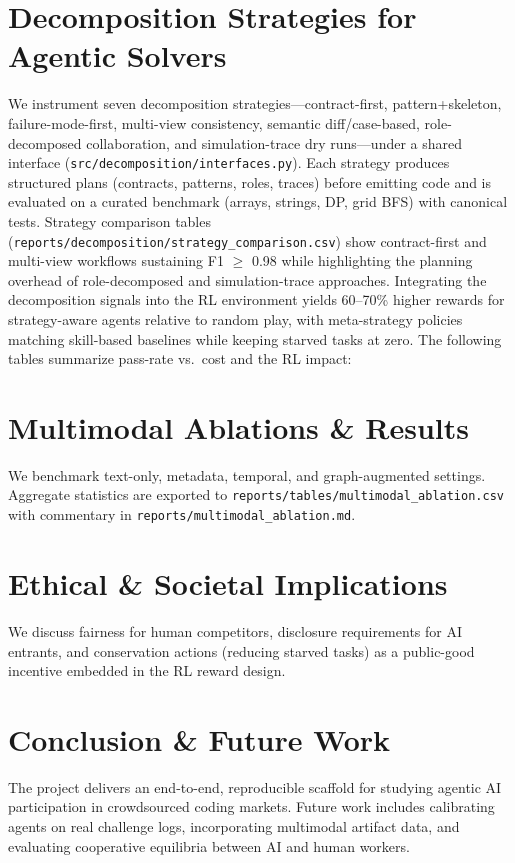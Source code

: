 \documentclass[11pt]{article}
\begin{document}
\section{Decomposition Strategies for Agentic Solvers}
We instrument seven decomposition strategies---contract-first, pattern+skeleton, failure-mode-first, multi-view consistency, semantic diff/case-based, role-decomposed collaboration, and simulation-trace dry runs---under a shared interface (\texttt{src/decomposition/interfaces.py}). Each strategy produces structured plans (contracts, patterns, roles, traces) before emitting code and is evaluated on a curated benchmark (arrays, strings, DP, grid BFS) with canonical tests. Strategy comparison tables (\texttt{reports/decomposition/strategy_comparison.csv}) show contract-first and multi-view workflows sustaining F1 $\geq$ 0.98 while highlighting the planning overhead of role-decomposed and simulation-trace approaches. Integrating the decomposition signals into the RL environment yields 60--70\% higher rewards for strategy-aware agents relative to random play, with meta-strategy policies matching skill-based baselines while keeping starved tasks at zero. The following tables summarize pass-rate vs.\ cost and the RL impact:


\section{Multimodal Ablations \& Results}
We benchmark text-only, metadata, temporal, and graph-augmented settings. Aggregate statistics are exported to \texttt{reports/tables/multimodal_ablation.csv} with commentary in \texttt{reports/multimodal_ablation.md}.

\section{Ethical \& Societal Implications}
We discuss fairness for human competitors, disclosure requirements for AI entrants, and conservation actions (reducing starved tasks) as a public-good incentive embedded in the RL reward design.

\section{Conclusion \& Future Work}
The project delivers an end-to-end, reproducible scaffold for studying agentic AI participation in crowdsourced coding markets. Future work includes calibrating agents on real challenge logs, incorporating multimodal artifact data, and evaluating cooperative equilibria between AI and human workers.



\end{document}
